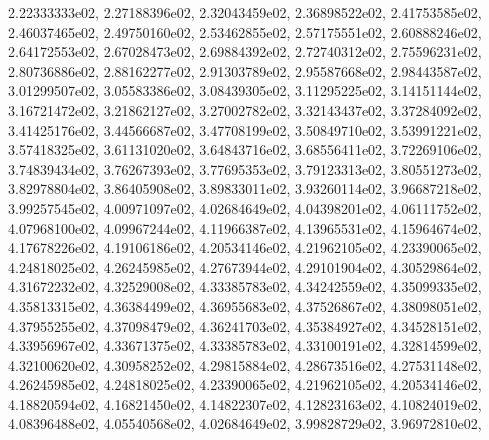 \documentclass[letterpaper,10pt,english]{sphinxmanual}
\begin{document}
\begin{fulllineitems}
2.22333333e\sphinxhyphen{}02, 2.27188396e\sphinxhyphen{}02, 2.32043459e\sphinxhyphen{}02, 2.36898522e\sphinxhyphen{}02, 2.41753585e\sphinxhyphen{}02, 2.46037465e\sphinxhyphen{}02, 2.49750160e\sphinxhyphen{}02, 2.53462855e\sphinxhyphen{}02, 2.57175551e\sphinxhyphen{}02, 2.60888246e\sphinxhyphen{}02, 2.64172553e\sphinxhyphen{}02, 2.67028473e\sphinxhyphen{}02, 2.69884392e\sphinxhyphen{}02, 2.72740312e\sphinxhyphen{}02, 2.75596231e\sphinxhyphen{}02, 2.80736886e\sphinxhyphen{}02, 2.88162277e\sphinxhyphen{}02, 2.91303789e\sphinxhyphen{}02, 2.95587668e\sphinxhyphen{}02, 2.98443587e\sphinxhyphen{}02, 3.01299507e\sphinxhyphen{}02, 3.05583386e\sphinxhyphen{}02, 3.08439305e\sphinxhyphen{}02, 3.11295225e\sphinxhyphen{}02, 3.14151144e\sphinxhyphen{}02, 3.16721472e\sphinxhyphen{}02, 3.21862127e\sphinxhyphen{}02, 3.27002782e\sphinxhyphen{}02, 3.32143437e\sphinxhyphen{}02, 3.37284092e\sphinxhyphen{}02, 3.41425176e\sphinxhyphen{}02, 3.44566687e\sphinxhyphen{}02, 3.47708199e\sphinxhyphen{}02, 3.50849710e\sphinxhyphen{}02, 3.53991221e\sphinxhyphen{}02, 3.57418325e\sphinxhyphen{}02, 3.61131020e\sphinxhyphen{}02, 3.64843716e\sphinxhyphen{}02, 3.68556411e\sphinxhyphen{}02, 3.72269106e\sphinxhyphen{}02, 3.74839434e\sphinxhyphen{}02, 3.76267393e\sphinxhyphen{}02, 3.77695353e\sphinxhyphen{}02, 3.79123313e\sphinxhyphen{}02, 3.80551273e\sphinxhyphen{}02, 3.82978804e\sphinxhyphen{}02, 3.86405908e\sphinxhyphen{}02, 3.89833011e\sphinxhyphen{}02, 3.93260114e\sphinxhyphen{}02, 3.96687218e\sphinxhyphen{}02, 3.99257545e\sphinxhyphen{}02, 4.00971097e\sphinxhyphen{}02, 4.02684649e\sphinxhyphen{}02, 4.04398201e\sphinxhyphen{}02, 4.06111752e\sphinxhyphen{}02, 4.07968100e\sphinxhyphen{}02, 4.09967244e\sphinxhyphen{}02, 4.11966387e\sphinxhyphen{}02, 4.13965531e\sphinxhyphen{}02, 4.15964674e\sphinxhyphen{}02, 4.17678226e\sphinxhyphen{}02, 4.19106186e\sphinxhyphen{}02, 4.20534146e\sphinxhyphen{}02, 4.21962105e\sphinxhyphen{}02, 4.23390065e\sphinxhyphen{}02, 4.24818025e\sphinxhyphen{}02, 4.26245985e\sphinxhyphen{}02, 4.27673944e\sphinxhyphen{}02, 4.29101904e\sphinxhyphen{}02, 4.30529864e\sphinxhyphen{}02, 4.31672232e\sphinxhyphen{}02, 4.32529008e\sphinxhyphen{}02, 4.33385783e\sphinxhyphen{}02, 4.34242559e\sphinxhyphen{}02, 4.35099335e\sphinxhyphen{}02, 4.35813315e\sphinxhyphen{}02, 4.36384499e\sphinxhyphen{}02, 4.36955683e\sphinxhyphen{}02, 4.37526867e\sphinxhyphen{}02, 4.38098051e\sphinxhyphen{}02, 4.37955255e\sphinxhyphen{}02, 4.37098479e\sphinxhyphen{}02, 4.36241703e\sphinxhyphen{}02, 4.35384927e\sphinxhyphen{}02, 4.34528151e\sphinxhyphen{}02, 4.33956967e\sphinxhyphen{}02, 4.33671375e\sphinxhyphen{}02, 4.33385783e\sphinxhyphen{}02, 4.33100191e\sphinxhyphen{}02, 4.32814599e\sphinxhyphen{}02, 4.32100620e\sphinxhyphen{}02, 4.30958252e\sphinxhyphen{}02, 4.29815884e\sphinxhyphen{}02, 4.28673516e\sphinxhyphen{}02, 4.27531148e\sphinxhyphen{}02, 4.26245985e\sphinxhyphen{}02, 4.24818025e\sphinxhyphen{}02, 4.23390065e\sphinxhyphen{}02, 4.21962105e\sphinxhyphen{}02, 4.20534146e\sphinxhyphen{}02, 4.18820594e\sphinxhyphen{}02, 4.16821450e\sphinxhyphen{}02, 4.14822307e\sphinxhyphen{}02, 4.12823163e\sphinxhyphen{}02, 4.10824019e\sphinxhyphen{}02, 4.08396488e\sphinxhyphen{}02, 4.05540568e\sphinxhyphen{}02, 4.02684649e\sphinxhyphen{}02, 3.99828729e\sphinxhyphen{}02, 3.96972810e\sphinxhyphen{}02, 
\end{fulllineitems}
\end{document}
